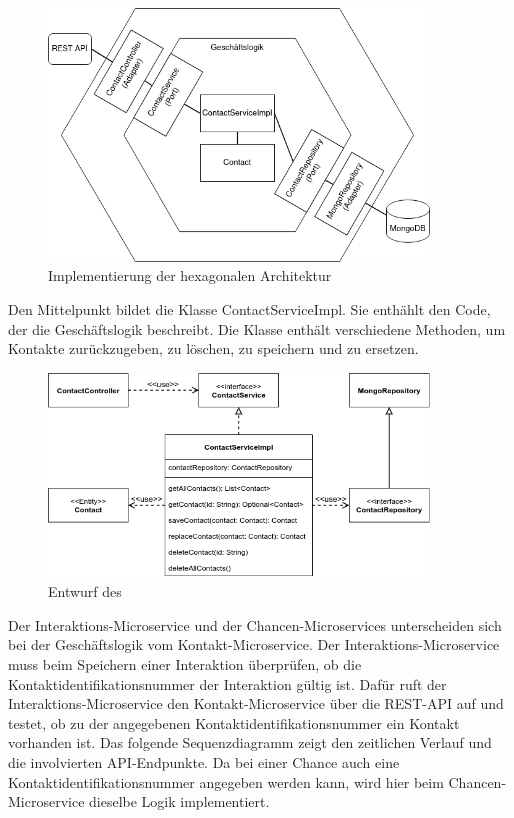 \begin{figure}[H] 
    \centering
    \includegraphics[width=0.9\textwidth]{figures/HexagonalDesign.png}
    \caption{Implementierung der hexagonalen Architektur}
\end{figure}

Den Mittelpunkt bildet die Klasse ContactServiceImpl. Sie enthählt den Code, der die Geschäftslogik beschreibt. Die Klasse enthält verschiedene Methoden, um Kontakte zurückzugeben, zu löschen, zu speichern und zu ersetzen.

\begin{figure}[H] 
    \centering
    \includegraphics[width=0.9\textwidth]{figures/UMLKlassenDiagrammKontakt.png}
    \caption{Entwurf des}
\end{figure}

Der Interaktions-Microservice und der Chancen-Microservices unterscheiden sich bei der Geschäftslogik vom Kontakt-Microservice. Der Interaktions-Microservice muss beim Speichern einer Interaktion überprüfen, ob die Kontaktidentifikationsnummer der Interaktion gültig ist. Dafür ruft der Interaktions-Microservice den Kontakt-Microservice über die REST-API auf und testet, ob zu der angegebenen Kontaktidentifikationsnummer ein Kontakt vorhanden ist. Das folgende Sequenzdiagramm zeigt den zeitlichen Verlauf und die involvierten \ac{API}-Endpunkte. Da bei einer Chance auch eine Kontaktidentifikationsnummer angegeben werden kann, wird hier beim Chancen-Microservice dieselbe Logik implementiert.

